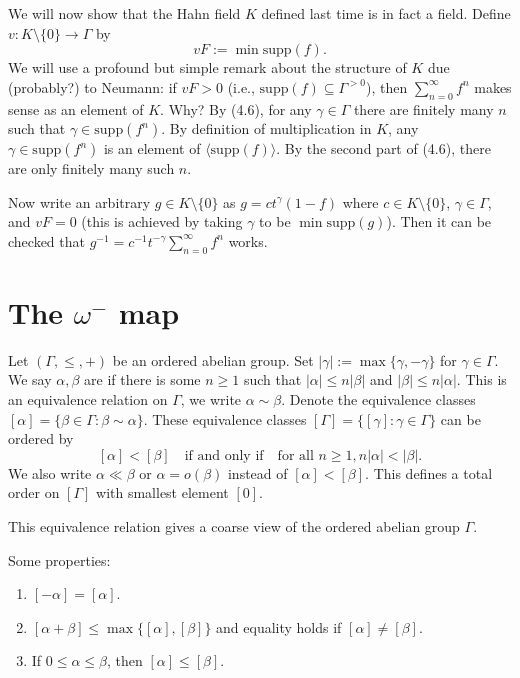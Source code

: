 We will now show that the Hahn field $K$ defined last time is in fact a field. Define $v:K\setminus \{0\}\rightarrow \Gamma$ by $$vF:=\min \mathrm{supp}(f).$$ We will use a profound but simple remark about the structure of $K$ due (probably?) to Neumann: if $vF>0$ (i.e., $\mathrm{supp}(f)\subseteq \Gamma^{>0}$), then $\sum_{n=0}^\infty f^n$ makes sense as an element of $K$. Why? By (4.6), for any $\gamma\in \Gamma$ there are finitely many $n$ such that $\gamma\in\mathrm{supp}(f^n)$. By definition of multiplication in $K$, any $\gamma\in \mathrm{supp}(f^n)$ is an element of $\langle \mathrm{supp}(f)\rangle$. By the second part of (4.6), there are only finitely many such $n$.

Now write an arbitrary $g\in K\setminus \{0\}$ as $g=ct^\gamma(1-f)$ where $c\in K\setminus \{0\}$, $\gamma\in \Gamma$, and $vF=0$ (this is achieved by taking $\gamma$ to be $\min\mathrm{supp}(g)$). Then it can be checked that $g^{-1}=c^{-1}t^{-\gamma}\sum_{n=0}^\infty f^n$ works.

\section{ The $\omega^-$ map }
Let $(\Gamma, \le, +)$ be an ordered abelian group. Set $|\gamma|:=\max\{\gamma, -\gamma\}$ for $\gamma\in \Gamma$. We say $\alpha,\beta$ are  if there is some $n\ge 1$ such that $|\alpha|\le n|\beta|$ and $|\beta|\le n|\alpha|$. This is an equivalence relation on $\Gamma$, we write $\alpha\sim\beta$. Denote the equivalence classes $[\alpha]=\{\beta\in\Gamma:\beta\sim\alpha\}$. These equivalence classes $[\Gamma]=\{[\gamma]:\gamma\in\Gamma\}$ can be ordered by 
$$[\alpha]<[\beta]\quad \textrm{if and only if} \quad \textrm{for all }n\ge 1, n|\alpha|<|\beta|.$$
We also write $\alpha\ll\beta$ or $\alpha=o(\beta)$ instead of $[\alpha]<[\beta]$. This defines a total order on $[\Gamma]$ with smallest element $[0]$.

This equivalence relation gives a coarse view of the ordered abelian group $\Gamma$.

Some properties:
\begin{enumerate}
  \item  $[-\alpha]=[\alpha]$.
  \item  $[\alpha+\beta]\le \max\{[\alpha],[\beta]\}$ and equality holds if $[\alpha]\neq [\beta]$.
  \item  If $0\le \alpha\le \beta$, then $[\alpha]\le [\beta]$.
\end{enumerate}


